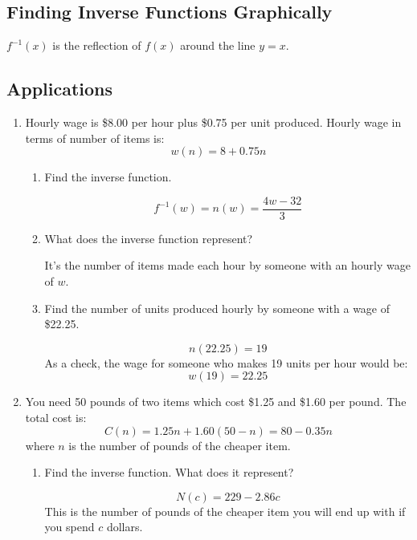 \documentclass{exam}
\begin{document}
\subsection{Finding Inverse Functions Graphically}

$f^{-1}(x)$ is the reflection of $f(x)$ around the line $y = x$.

\subsection{Applications}

\begin{enumerate}
  \item Hourly wage is \$8.00 per hour plus \$0.75 per unit produced.  Hourly wage in terms of number of items is:
    \[
      w(n) = 8 + 0.75n
    \]

    \begin{enumerate}[a]
      \item Find the inverse function.  
        \begin{solution}
          \[
            f^{-1}(w) = n(w) = \frac{4w - 32}{3}
          \]
        \end{solution}

      \item What does the inverse function represent? 
        \begin{solution}
          It's the number of items made each hour by someone with an hourly wage of $w$.
        \end{solution}

      \item Find the number of units produced hourly by someone with a wage of \$22.25.
        \begin{solution}
          \[
            n(22.25) = 19
          \]
          As a check, the wage for someone who makes 19 units per hour would be:
          \[
            w(19) = 22.25
          \]
        \end{solution}
    \end{enumerate}

  \item You need 50 pounds of two items which cost \$1.25 and \$1.60 per pound.  The total cost is:
    \[
      C(n) = 1.25n + 1.60(50 - n) = 80 - 0.35n
    \]
    where $n$ is the number of pounds of the cheaper item.

    \begin{enumerate}[a]
      \item Find the inverse function.  What does it represent?
        \begin{solution}
          \[
            N(c) = 229 - 2.86c
          \]
          This is the number of pounds of the cheaper item you will end up with if you spend $c$ dollars.
        \end{solution}
        

\end{enumerate}
\end{enumerate}
\end{document}
